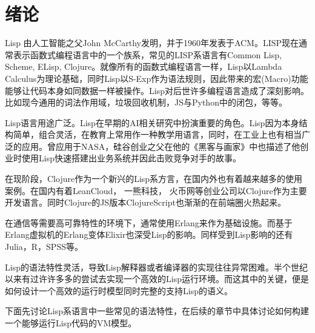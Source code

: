 ﻿%
%

\chapter{绪论}

Lisp 由人工智能之父John McCarthy发明，并于1960年发表于ACM\cite{mccarthy60}。LISP现在通常表示函数式编程语言中的一个族系，常见的LISP系语言有Common Lisp, Scheme, ELisp, Clojure。就像所有的函数式编程语言一样，Lisp以Lambda Calculus为理论基础，同时Lisp以S-Exp作为语法规则，因此带来的宏(Macro)功能能够让代码本身如同数据一样被操作。Lisp对后世许多编程语言造成了深刻影响。比如现今通用的词法作用域，垃圾回收机制，JS与Python中的闭包，等等。

Lisp语言用途广泛。Lisp在早期的AI相关研究中扮演重要的角色。Lisp因为本身结构简单，组合灵活，在教育上常用作一种教学用语言，同时，在工业上也有相当广泛的应用。曾应用于NASA，硅谷创业之父在他的《黑客与画家》中也描述了他创业时使用Lisp快速搭建出业务系统并因此击败竞争对手的故事。

在现阶段，Clojure作为一个新兴的Lisp系方言，在国内外也有着越来越多的使用案例。在国内有着LeanCloud， 一熊科技， 火币网等创业公司以Clojure作为主要开发语言。同时Clojure的JS版本ClojureScript也渐渐的在前端圈火热起来。

在通信等需要高可靠特性的环境下，通常使用Erlang\cite{armstrong07}来作为基础设施。而基于Erlang虚拟机的Erlang变体Elixir也深受Lisp的影响。同样受到Lisp影响的还有Julia，R，SPSS等。

Lisp的语法特性灵活，导致Lisp解释器或者编译器的实现往往异常困难。半个世纪以来有过许许多多的尝试去实现一个高效的Lisp运行环境。而这其中的关键，便是如何设计一个高效的运行时模型同时完整的支持Lisp的语义。

下面先讨论Lisp系语言中一些常见的语法特性，在后续的章节中具体讨论如何构建一个能够运行Lisp代码的VM模型。
